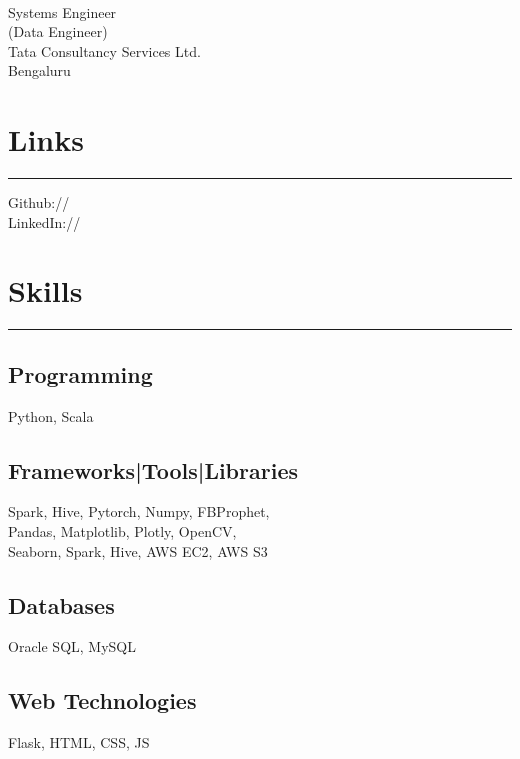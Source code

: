 \documentclass[]{puneet-resume}
\begin{document}
%
%

\begin{minipage}[t]{0.33\textwidth} 
\begin{large}
	\\
\end{large}
Systems Engineer\\
(Data Engineer)\\
Tata Consultancy Services Ltd.\\
Bengaluru
\section{Links} 
\noindent\rule{5cm}{0.4pt}

Github:// \href{https://github.com/puneet29}{} \\
LinkedIn://  \href{https://www.linkedin.com/in/geekpuneet}{} \\
\section{Skills}
\noindent\rule{5cm}{0.4pt}
\subsection{Programming}
Python, Scala
\vspace{6pt}
\subsection{Frameworks|Tools|Libraries}
Spark, Hive, Pytorch, Numpy, FBProphet,\\
Pandas, Matplotlib, Plotly, OpenCV,\\
Seaborn, Spark, Hive, AWS EC2, AWS S3
\vspace{6pt}
\subsection{Databases}
Oracle SQL, MySQL
\vspace{6pt}
\subsection{Web Technologies}
Flask, HTML, CSS, JS
\vspace{6pt}

\end{minipage}
\end{document}
